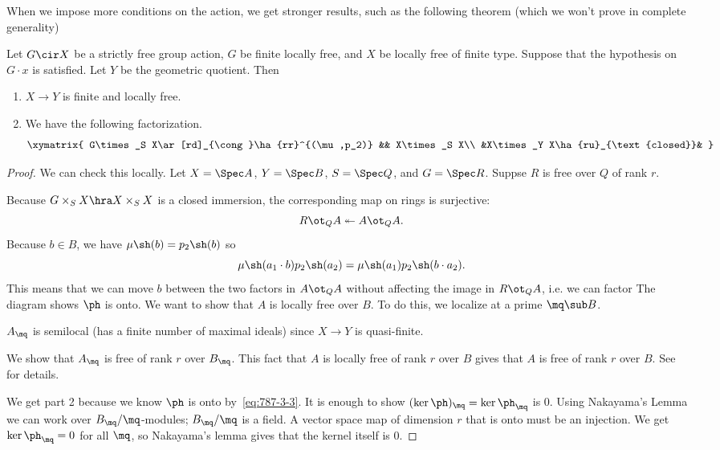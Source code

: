 When we impose more conditions on the action, we get stronger results, such as the following theorem (which we won't prove in complete generality)
\begin{thm}
Let $G\cir X$ be a strictly free group action, $G$ be finite locally free, and $X$ be locally free of finite type. Suppose that the hypothesis on $G\cdot x$ is satisfied. Let $Y$ be the geometric quotient. Then 
\begin{enumerate}
\item
$X\to Y$ is finite and locally free.
\item
We have the following factorization.
\[%
\xymatrix{
G\times_S X\ar[rd]_{\cong}\ha{rr}^{(\mu,p_2)} && X\times_S X\\
&X\times_Y X\ha{ru}_{\text{closed}}&
}
\]
\end{enumerate}
\end{thm}
\begin{proof}
We can check this locally. Let $X=\Spec A$, $Y=\Spec B$, $S=\Spec Q$, and $G=\Spec R$. Suppse $R$ is free over $Q$ of rank $r$. 

Because $G\times_S X\hra X\times_S X$ is a closed immersion, the corresponding map on rings is surjective: 
\[R\ot_QA\twoheadleftarrow A\ot_Q A .\]  Because $b\in B$, we have $\mu\sh(b)=p_2\sh (b)$ so
\[
\mu\sh(a_1\cdot b)p_2\sh(a_2)=\mu\sh(a_1)p_2\sh(b\cdot a_2).
\]
This means that we can move $b$ between the two factors in $A\ot_Q A$ without affecting the image in $R\ot_Q A$, i.e. we can factor
%
%
\eeq 
The diagram shows $\ph$ is onto. We want to show that $A$ is locally free over $B$. %
To do this, we localize at a prime $\mq\sub B$.

$A_{\mq}$ is semilocal (has a finite number of maximal ideals) since $X\to Y$ is quasi-finite.

We show that $A_{\mq}$ is free of rank $r$ over $B_{\mq}$. This fact that $A$ is locally free of rank $r$ over $B$ gives that $A$ is free of rank $r$ over $B$. See~\cite[4.25]{GGBM} for details. 

We get part 2 because we know $\ph$ is onto by~\eqref{eq:787-3-3}. It is enough to show $(\ker\ph)_{\mq}=\ker \ph_{\mq}$ is 0. Using Nakayama's Lemma we can work over $B_{\mq}/\mq$-modules; $B_{\mq}/\mq$ is a field. A vector space map of dimension $r$ that is onto must be an injection. We get $\ker\ph_{\mq}=0$ for all $\mq$, so Nakayama's lemma gives that the kernel itself is 0. 
\end{proof}
